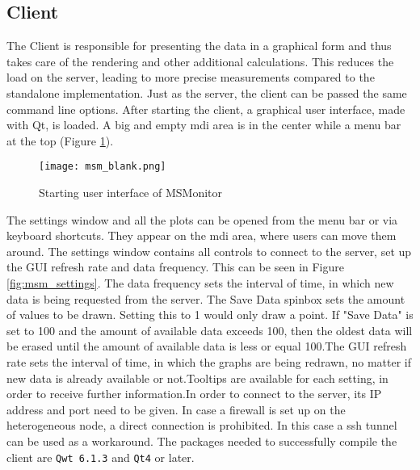 \subsection{Client}
The Client is responsible for presenting the data in a graphical form and thus takes care of the rendering and other additional calculations. This reduces the load on the server, leading to more precise measurements compared to the standalone implementation.\newline
Just as the server, the client can be passed the same command line options.\newline
After starting the client, a graphical user interface, made with Qt, is loaded. A big and empty mdi area is in the center while a menu bar at the top (Figure \ref{fig:msm_blank}).\newline
\begin{figure}[t!]
	\begin{center}
		\texttt{[image: msm\_blank.png]} 
		\caption{Starting user interface of MSMonitor}
		\label{fig:msm_blank}
	\end{center}
\end{figure}
The settings window and all the plots can be opened from the menu bar or via keyboard shortcuts. They appear on the mdi area, where users can move them around.\newline
The settings window contains all controls to connect to the server, set up the GUI refresh rate and data frequency. This can be seen in Figure \ref{fig:msm_settings}. The data frequency sets the interval of time, in which new data is being requested from the server. The Save Data spinbox sets the amount of values to be drawn. Setting this to 1 would only draw a point. If "Save Data" is set to 100 and the amount of available data exceeds 100, then the oldest data will be erased until the amount of available data is less or equal 100.\newline The GUI refresh rate sets the interval of time, in which the graphs are being redrawn, no matter if new data is already available or not.\newline Tooltips are available for each setting, in order to receive further information.\newline In order to connect to the server, its IP address and port need to be given. In case a firewall is set up on the heterogeneous node, a direct connection is prohibited. In this case a ssh tunnel can be used as a workaround.\newline
The packages needed to successfully compile the client are \texttt{Qwt 6.1.3} and \texttt{Qt4} or later.

